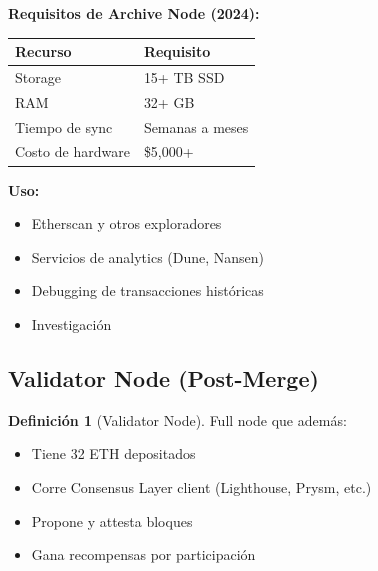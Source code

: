 \documentclass[11pt,a4paper,twoside,openright]{book}
\theoremstyle{definition}
\newtheorem{definition}{Definición}[chapter]
\theoremstyle{plain}
\theoremstyle{remark}
\begin{document}
\begin{mathnote}
\textbf{Requisitos de Archive Node (2024):}

\begin{center}
\begin{tabular}{ll}
\toprule
\textbf{Recurso} & \textbf{Requisito} \\
\midrule
Storage & 15+ TB SSD \\
RAM & 32+ GB \\
Tiempo de sync & Semanas a meses \\
Costo de hardware & \$5,000+ \\
\bottomrule
\end{tabular}
\end{center}

\textbf{Uso:}
\begin{itemize}
    \item Etherscan y otros exploradores
    \item Servicios de analytics (Dune, Nansen)
    \item Debugging de transacciones históricas
    \item Investigación
\end{itemize}
\end{mathnote}

\subsection{Validator Node (Post-Merge)}

\begin{definition}[Validator Node]
Full node que además:
\begin{itemize}
    \item Tiene 32 ETH depositados
    \item Corre Consensus Layer client (Lighthouse, Prysm, etc.)
    \item Propone y attesta bloques
    \item Gana recompensas por participación
\end{itemize}
\end{definition}
\end{document}
